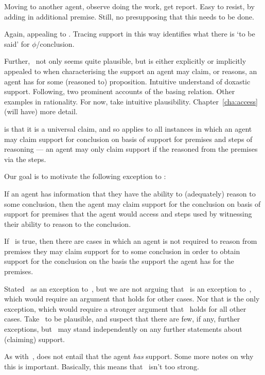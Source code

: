 \begin{note}[Focus]
  Moving to another agent, observe doing the work, get report.
  Easy to resist, by adding in additional premise.
  Still, no presupposing that this needs to be done.

  {
  Again, appealing to \eiS{}.
  Tracing support in this way identifies what there is `to be said' for \(\phi\)/conclusion.
  }

  Further,~\uRa{} not only seems quite plausible, but is either explicitly or implicitly appealed to when characterising the support an agent may claim, or reasons, an agent has for some (reasoned to) proposition.\nolinebreak
  {\color{red}
    Intuitive understand of doxastic support.
    Following, two prominent accounts of the basing relation.
    Other examples in rationality.
    For now, take intuitive plausibility.
    Chapter~\ref{cha:access} (will have) more detail.
  }
\end{note}

\begin{note}[Alternative]
  \uRa{} is that it is a universal claim, and so applies to all instances in which an agent may claim support for conclusion on basis of support for premises and steps of reasoning --- an agent may only claim support if the reasoned from the premises via the steps.

  Our goal is to motivate the following exception to \uRa{}:
  \begin{proposition}[\rC{-} --- \rC{}]\label{rC}
    If an agent has information that they have the ability to (adequately) reason to some conclusion, then the agent may claim support for the conclusion on basis of support for premises that the agent would access and steps used by witnessing their ability to reason to the conclusion.
  \end{proposition}

  If~\rC{} is true, then there are cases in which an agent is not required to reason from premises they may claim support for to some conclusion in order to obtain support for the conclusion on the basis the support the agent has for the premises.

  Stated~\rC{} as an exception to~\uRa{}, but we are not arguing that~\rC{} is an exception to~\uRa{}, which would require an argument that \uRa{} holds for other cases.
  Nor that \rC{} is the only exception, which would require a stronger argument that~\uRa{} holds for all other cases.
  Take~\uRa{} to be plausible, and suspect that there are few, if any, further exceptions, but~\rC{} may stand independently on any further statements about (claiming) support.

  As with~\uRa{}, \rC{} does not entail that the agent \emph{has} support.
  {
    \color{red}
    Some more notes on why this is important.
    Basically, this means that~\rC{} isn't too strong.
  }
\end{note}

